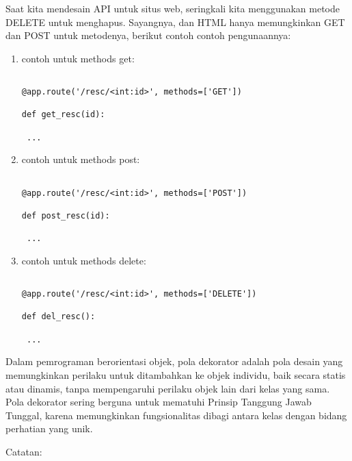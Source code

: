 \documentclass[12pt,a4paper]{article}
\begin{document}
Saat kita mendesain API untuk situs web, seringkali kita menggunakan metode DELETE untuk menghapus. Sayangnya, dan HTML hanya memungkinkan GET dan POST untuk metodenya, berikut contoh contoh pengunaannya:



\begin{enumerate}

\item contoh untuk methods get:

\begin{verbatim} 

@app.route('/resc/<int:id>', methods=['GET'])

def get_resc(id):

 ...

\end{verbatim}



\item contoh untuk methods post:

\begin{verbatim} 

@app.route('/resc/<int:id>', methods=['POST'])

def post_resc(id):

 ...

\end{verbatim}



\item contoh untuk methods delete:

\begin{verbatim} 

@app.route('/resc/<int:id>', methods=['DELETE'])

def del_resc():

 ...

\end{verbatim}

\end{enumerate}

Dalam pemrograman berorientasi objek, pola dekorator adalah pola desain yang memungkinkan perilaku untuk ditambahkan ke objek individu, baik secara statis atau dinamis, tanpa mempengaruhi perilaku objek lain dari kelas yang sama. Pola dekorator sering berguna untuk mematuhi Prinsip Tanggung Jawab Tunggal, karena memungkinkan fungsionalitas dibagi antara kelas dengan bidang perhatian yang unik.



Catatan:
\end{document}
